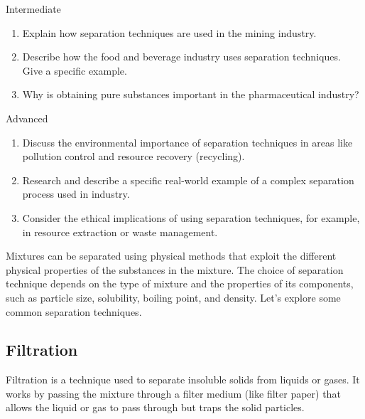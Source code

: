 \begin{tieredquestions}{Intermediate}
\begin{enumerate}
    \item Explain how separation techniques are used in the mining industry.
    \item Describe how the food and beverage industry uses separation techniques. Give a specific example.
    \item  Why is obtaining pure substances important in the pharmaceutical industry?
\end{enumerate}
\end{tieredquestions}

\begin{tieredquestions}{Advanced}
\begin{enumerate}
    \item  Discuss the environmental importance of separation techniques in areas like pollution control and resource recovery (recycling).
    \item  Research and describe a specific real-world example of a complex separation process used in industry.
    \item  Consider the ethical implications of using separation techniques, for example, in resource extraction or waste management.
\end{enumerate}
\end{tieredquestions}


\FloatBarrier
\1

Mixtures can be separated using physical methods that exploit the different physical properties of the substances in the mixture. The choice of separation technique depends on the type of mixture and the properties of its components, such as particle size, solubility, boiling point, and density. Let's explore some common separation techniques.


\subsection{Filtration}

\begin{keyconcept}{Filtration}
 is a technique used to separate insoluble solids from liquids or gases. It works by passing the mixture through a filter medium (like filter paper) that allows the liquid or gas to pass through but traps the solid particles.
\end{keyconcept}

